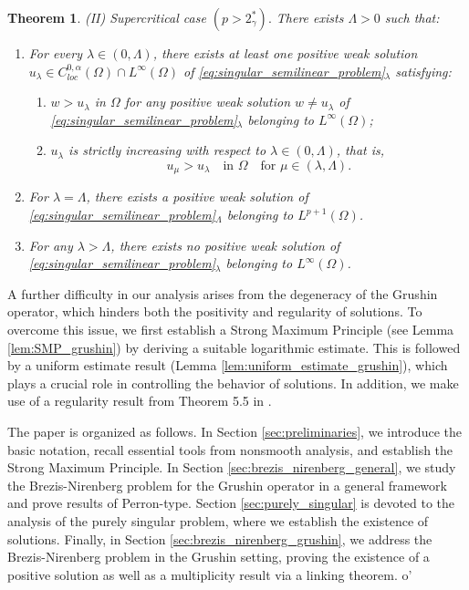 \documentclass[11pt]{article}
\newtheorem{theorem}{Theorem}[section] %
\begin{document}
\begin{theorem}
\noindent\textnormal{(II) Supercritical case} $(p > 2_{\gamma}^*).$
There exists $\Lambda>0$ such that:
\begin{enumerate}
 \item[(1)] For every $\lambda \in (0,\Lambda)$, there exists at least one positive weak solution $u_{\lambda} \in C_{loc}^{0,\alpha}(\Omega) \cap L^{\infty}(\Omega)$ of \eqref{eq:singular_semilinear_problem}$_{\lambda}$ satisfying:
  \begin{enumerate}
    \item[(i)] $w > u_{\lambda}$ in $\Omega$ for any positive weak solution $w \neq u_{\lambda}$ of \eqref{eq:singular_semilinear_problem}$_{\lambda}$ belonging to $L^{\infty}(\Omega)$;
    \item[(ii)] $u_{\lambda}$ is strictly increasing with respect to $\lambda \in (0,\Lambda)$, that is,
    \[
      u_{\mu} > u_{\lambda} \quad \text{in } \Omega \quad \text{for } \mu \in (\lambda,\Lambda).
    \]
  \end{enumerate}
  \item[(2)] For $\lambda = \Lambda$, there exists a positive weak solution of \eqref{eq:singular_semilinear_problem}$_{\Lambda}$ belonging to $L^{p+1}(\Omega)$.
  \item[(3)] For any $\lambda > \Lambda$, there exists no positive weak solution of \eqref{eq:singular_semilinear_problem}$_{\lambda}$ belonging to $L^{\infty}(\Omega)$.
\end{enumerate}
\end{theorem}

A further difficulty in our analysis arises from the degeneracy of the Grushin operator, which hinders both the positivity and regularity of solutions. To overcome this issue, we first establish a Strong Maximum Principle (see Lemma \ref{lem:SMP_grushin}) by deriving a suitable logarithmic estimate. This is followed by a uniform estimate result (Lemma \ref{lem:uniform_estimate_grushin}), which plays a crucial role in controlling the behavior of solutions. In addition, we make use of a regularity result from Theorem 5.5 in \cite{lanconelli_holder_Xelliptic}.

The paper is organized as follows. In Section \ref{sec:preliminaries}, we introduce the basic notation, recall essential tools from nonsmooth analysis, and establish the Strong Maximum Principle. In Section \ref{sec:brezis_nirenberg_general}, we study the Brezis-Nirenberg problem for the Grushin operator in a general framework and prove results of Perron-type. Section \ref{sec:purely_singular} is devoted to the analysis of the purely singular problem, where we establish the existence of solutions. Finally, in Section \ref{sec:brezis_nirenberg_grushin}, we address the Brezis-Nirenberg problem in the Grushin setting, proving the existence of a positive solution as well as a multiplicity result via a linking theorem.
o'
\end{document}

